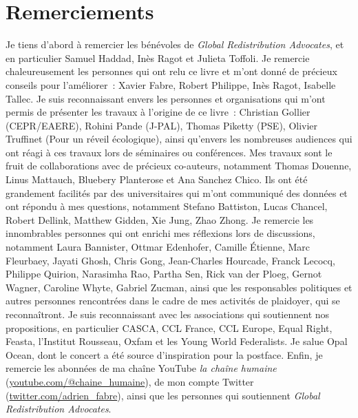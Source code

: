 \documentclass[a5paper,french,openany]{memoir}
\begin{document}
\renewcommand{\url}[1]{\href{#1}{Link}} %
{\small 

}

\clearpage
\section*{Remerciements}\label{sec:merci} 
Je tiens d'abord à remercier les bénévoles de \textit{Global Redistribution Advocates}, et en particulier Samuel Haddad, Inès Ragot et Julieta Toffoli. Je remercie chaleureusement les personnes qui ont relu ce livre et m'ont donné de précieux conseils pour l'améliorer~: Xavier Fabre, Robert Philippe, Inès Ragot, Isabelle Tallec. Je suis reconnaissant envers les personnes et organisations qui m'ont permis de présenter les travaux à l'origine de ce livre~: Christian Gollier (CEPR/EAERE), Rohini Pande (J-PAL), Thomas Piketty (PSE), Olivier Truffinet (Pour un réveil écologique), ainsi qu'envers les nombreuses audiences qui ont réagi à ces travaux lors de séminaires ou conférences. Mes travaux sont le fruit de collaborations avec de précieux co-auteurs, notamment Thomas Douenne, Linus Mattauch, Bluebery Planterose et Ana Sanchez Chico. Ils ont été grandement facilités par des universitaires qui m'ont communiqué des données et ont répondu à mes questions, notamment Stefano Battiston, Lucas Chancel, Robert Dellink, Matthew Gidden, Xie Jung, Zhao Zhong. %
Je remercie les innombrables personnes qui ont enrichi mes réflexions lors de discussions, notamment Laura Bannister, Ottmar Edenhofer, Camille Étienne, Marc Fleurbaey, Jayati Ghosh, Chris Gong, Jean-Charles Hourcade, Franck Lecocq, Philippe Quirion, Narasimha Rao, Partha Sen, Rick van der Ploeg, Gernot Wagner,  Caroline Whyte, Gabriel Zucman, ainsi que les responsables politiques et autres personnes rencontrées dans le cadre de mes activités de plaidoyer, qui se reconnaîtront. Je suis reconnaissant avec les associations qui soutiennent nos propositions, en particulier CASCA, CCL France, CCL Europe, Equal Right, Feasta, l'Institut Rousseau, Oxfam et les Young World Federalists. Je salue Opal Ocean, dont le concert a été source d'inspiration pour la postface. Enfin, je remercie les abonné\textperiodcentered{}e\textperiodcentered{}s de ma chaîne YouTube \textit{la chaîne humaine} (\href{https://www.youtube.com/@chaine_humaine}{youtube.com/@chaine\_humaine}), de mon compte Twitter (\href{https://twitter.com/adrien_fabre}{twitter.com/adrien\_fabre}), ainsi que les personnes qui soutiennent \textit{Global Redistribution Advocates}.

\pagebreak \vspace*{-2cm}
\listoftables \vspace{-1cm}
\listoffigures
\end{document}
